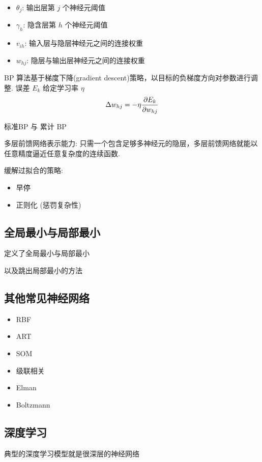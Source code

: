 \begin{itemize}
    \item $\theta_j$: 输出层第 $j$ 个神经元阈值
    \item $\gamma_h$: 隐含层第 $h$ 个神经元阈值
    \item $v_{ih}$: 输入层与隐层神经元之间的连接权重
    \item $w_{hj}$: 隐层与输出层神经元之间的连接权重
\end{itemize}

BP 算法基于梯度下降(gradient descent)策略，以目标的负梯度方向对参数进行调整. 误差 $E_k$ 给定学习率 $\eta$ 
\begin{align*}
    \Delta w_{hj}=-\eta\frac{\partial E_k}{\partial w_{hj}}
\end{align*}

标准BP 与 累计 BP

多层前馈网络表示能力: 只需一个包含足够多神经元的隐层，多层前馈网络就能以任意精度逼近任意复杂度的连续函数. 

缓解过拟合的策略:
\begin{itemize}
    \item 早停
    \item 正则化 (惩罚复杂性)
\end{itemize}

\subsection{全局最小与局部最小}
定义了全局最小与局部最小

以及跳出局部最小的方法

\subsection{其他常见神经网络}
\begin{itemize}
    \item RBF
    \item ART
    \item SOM
    \item 级联相关
    \item Elman
    \item Boltzmann
\end{itemize}
\subsection{深度学习}
典型的深度学习模型就是很深层的神经网络